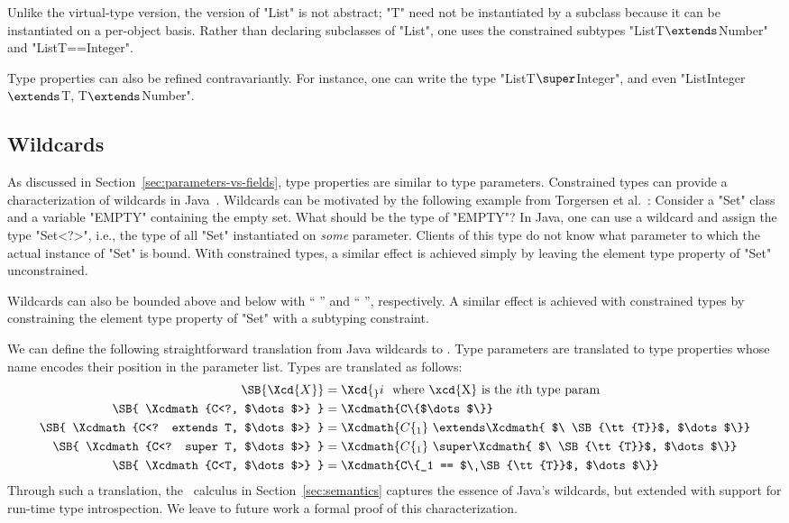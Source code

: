 \noindent
Unlike the virtual-type version,
the \Xten{} version of \xcd"List" is not abstract;
\xcd"T" need not be instantiated by a subclass because it can be
instantiated on a per-object basis.
Rather than declaring subclasses of \xcd"List",
one uses the constrained subtypes
\xcdmath"List{T$\extends$Number}" and \xcd"List{T==Integer}".

Type properties can also be refined contravariantly.
For instance, one can write the type \xcdmath"List{T$\super$Integer}",
and even \xcdmath"List{Integer$\extends$T, T$\extends$Number}".

\subsection{Wildcards}
\label{sec:wildcards}

As discussed in Section~\ref{sec:parameters-vs-fields},
type properties are similar to type
parameters.
Constrained types can provide a characterization of
wildcards in Java~\cite{Java3,adding-wildcards,wildcards-safe}.
Wildcards can be motivated
by the following example from Torgersen et al.~\cite{adding-wildcards}:
Consider a \xcd"Set" class and a variable \xcd"EMPTY" containing
the empty set.  What should be the type of \xcd"EMPTY"?
In Java, one can use a wildcard and 
assign the type \xcd"Set<?>", i.e., the type of all \xcd"Set"
instantiated on \emph{some} parameter.  Clients of this
type do not know what parameter to which the actual instance of \xcd"Set"
is bound.
With constrained types,
a similar effect is achieved simply by leaving the
element type property of \xcd"Set" unconstrained.

Wildcards can
also be bounded above and below with
``  '' and ``  '',
respectively.
%
A similar effect is achieved with constrained types by constraining
the
element type property of \xcd"Set" with a subtyping constraint.

We can define the following straightforward translation
from Java wildcards to \Xten{}.
Type parameters are translated to type properties whose name
encodes their position in the parameter list.
Types are translated as follows:
\begin{align*}
\SB{ \Xcd{X} } &= \Xcd{_}i ~~\hfill \mbox{where \xcd{X} is the $i$th type param} \\
\SB{ \Xcdmath{C<?, $\dots$>} } &= \Xcdmath{C\{$\dots$\}} \\
\SB{ \Xcdmath{C<? extends T, $\dots$>} } &= \Xcdmath{C\{_1 } \ \extends\Xcdmath{ $\ \SB{\tt{T}}$, $\dots$\}} \\
\SB{ \Xcdmath{C<? super T, $\dots$>} } &= \Xcdmath{C\{_1 } \ \super\Xcdmath{ $\ \SB{\tt{T}}$, $\dots$\}} \\
\SB{ \Xcdmath{C<T, $\dots$>} } &= \Xcdmath{C\{_1 == $\ \SB{\tt{T}}$, $\dots$\}}
\end{align*}
\noindent
Through such a translation, the \FXG\ calculus in
Section~\ref{sec:semantics} captures the essence of Java's
wildcards, but extended with support for run-time type
introspection.  We leave to future work a formal proof of this
characterization.

